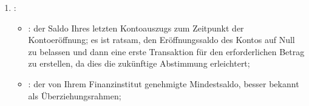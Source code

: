 \begin{enumerate}
\begin{itemize}
		\item {}: zeigt den Code des oben ausgewählten Finanzinstituts an;
		\item {}: die Adresse Ihrer Bankfiliale, die Sie auch in Ihren Bankkontodaten finden (siehe Abschnitt \vref{setup-resources-banks});
		\item {}: Ihre Bankdaten einsehen (siehe Abschnitt \vref{setup-resources-banks});
	\end{itemize}
	\item {}:
	\begin{itemize}
		\item {}: der Saldo Ihres letzten Kontoauszugs zum Zeitpunkt der Kontoeröffnung; es ist ratsam, den Eröffnungssaldo des Kontos auf Null zu belassen und dann eine erste Transaktion für den erforderlichen Betrag zu erstellen, da dies die zukünftige Abstimmung erleichtert; 
		\item {}: der von Ihrem Finanzinstitut genehmigte Mindestsaldo, besser bekannt als Überziehungsrahmen;

\end{itemize}
\end{enumerate}
